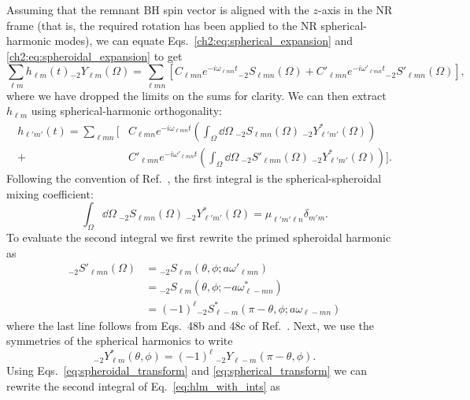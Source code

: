 Assuming that the remnant BH spin vector is aligned with the $z$-axis in the NR frame (that is, the required rotation has been applied to the NR spherical-harmonic modes), we can equate Eqs.~\ref{ch2:eq:spherical_expansion} and \ref{ch2:eq:spheroidal_expansion} to get
\begin{equation}
    \sum_{\ell m} h_{\ell m}(t) {}_{-2}Y_{\ell m}(\Omega) = \sum_{\ell m n} \left[ C_{\ell m n} e^{-i \omega_{\ell m n} t} {}_{-2}S_{\ell m n}(\Omega) + C'_{\ell m n} e^{-i \omega'_{\ell m n} t} {}_{-2}S'_{\ell m n}(\Omega) \right],
\end{equation}
where we have dropped the limits on the sums for clarity.
We can then extract $h_{\ell m}$ using spherical-harmonic orthogonality:
\begin{align}\label{eq:hlm_with_ints}
    h_{\ell' m'}(t) = \sum_{\ell m n} \bigg[ &C_{\ell m n} e^{-i \omega_{\ell m n} t} \left(\int_\Omega \dd{\Omega} ~ {}_{-2}S_{\ell m n}(\Omega) ~ {}_{-2}Y^*_{\ell' m'}(\Omega)\right) \nonumber \\
    + &C'_{\ell m n} e^{-i \omega'_{\ell m n} t} \left(\int_\Omega \dd{\Omega} ~ {}_{-2}S'_{\ell m n}(\Omega) ~ {}_{-2}Y^*_{\ell' m'}(\Omega)\right) \bigg].
\end{align}
Following the convention of Ref.~\cite{Stein:2019mop}, the first integral is the spherical-spheroidal mixing coefficient:
\begin{equation}
    \int_\Omega \dd{\Omega} ~ {}_{-2}S_{\ell m n}(\Omega) ~ {}_{-2}Y^*_{\ell' m'}(\Omega) = \mu_{\ell' m' \ell n} \delta_{m' m}.
\end{equation}
To evaluate the second integral we first rewrite the primed spheroidal harmonic as 
\begin{align}\label{eq:spheroidal_transform}
    {}_{-2}S'_{\ell m n}(\Omega) &= {}_{-2}S_{\ell m}(\theta, \phi; a\omega'_{\ell m n}) \nonumber \\
    &= {}_{-2}S_{\ell m}(\theta, \phi; -a\omega^*_{\ell -m n}) \nonumber \\
    &= (-1)^\ell {}_{-2}S^*_{\ell -m}(\pi - \theta, \phi; a\omega_{\ell -m n})
\end{align}
where the last line follows from Eqs.~48b and 48c of Ref.~\cite{Cook:2014cta}.
Next, we use the symmetries of the spherical harmonics to write
\begin{equation}\label{eq:spherical_transform}
    {}_{-2}Y^*_{\ell m}(\theta, \phi) = (-1)^{\ell} ~ {}_{-2}Y_{\ell -m}(\pi - \theta, \phi).
\end{equation}
Using Eqs.~\ref{eq:spheroidal_transform} and \ref{eq:spherical_transform} we can rewrite the second integral of Eq.~\ref{eq:hlm_with_ints} as
